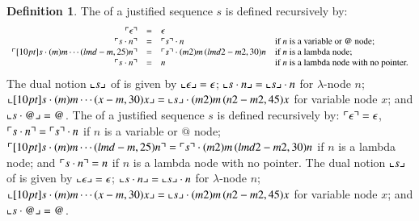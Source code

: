 \documentclass{elsarticle}
\newif\iflongversion
\theoremstyle{plain}
\theoremstyle{definition}
\newtheorem{definition}{Definition}[section]
\begin{document}
\begin{definition}
    \label{def:views}
\iflongversion %
The  of a justified sequence $s$ is defined recursively by:
$$\begin{array}{rcll}
 \pview{\epsilon} &=&  \epsilon \\
 \pview{s \cdot n }  &=&  \pview{s} \cdot n
    & \mbox{if $n$ is a variable or $@$ node;}
    \\
 \pview{\Pstr[10pt]{ s \cdot (m){m} \cdots (lmd-m,25){n}}} &=&
        \Pstr{ \pview{s} \cdot (m2){m} \, (lmd2-m2,30){n} }
    & \mbox{if $n$ is a lambda node;}
    \\
 \pview{s \cdot n }  &=&  n & \mbox{if $n$ is a lambda node with no pointer.}
\end{array}$$
%
The dual notion $\llcorner s \lrcorner$ of  is given by
$\llcorner \epsilon \lrcorner = \epsilon$;
$\llcorner s \cdot n  \lrcorner  =  \llcorner s \lrcorner \cdot n$ for $\lambda$-node $n$;
$\oview{\Pstr[10pt]{s \cdot (m){m} \cdots (x-m,30){x}}}= \Pstr{ \oview{s} \cdot (m2){m} \, (n2-m2,45){x} }$ for variable node $x$; and $\llcorner s \cdot @  \lrcorner = @$.
%
%
\else %
    The  of a justified sequence $s$ is defined recursively by:
    $\ulcorner \epsilon \urcorner = \epsilon$,
    $\ulcorner s \cdot n  \urcorner =  \ulcorner s \urcorner \cdot n$
        if $n$ is a variable or $@$ node;
    $\pview{\Pstr[10pt]{ s \cdot (m){m} \cdots (lmd-m,25){n}}} =
        \Pstr{ \pview{s} \cdot (m2){m} \, (lmd2-m2,30){n} }$
        if $n$ is a lambda node;
    and  $\ulcorner s \cdot n  \urcorner  =  n$
        if $n$ is a lambda node with no pointer.
    The dual notion $\llcorner s \lrcorner$ of  is given by
    $\llcorner \epsilon \lrcorner = \epsilon$;
    $\llcorner s \cdot n  \lrcorner  =  \llcorner s \lrcorner \cdot n$ for $\lambda$-node $n$;
    $\oview{\Pstr[10pt]{s \cdot (m){m} \cdots (x-m,30){x}}}= \Pstr{ \oview{s} \cdot (m2){m} \, (n2-m2,45){x} }$ for variable node $x$; and $\llcorner s \cdot @  \lrcorner = @$.

\end{definition}
\end{document}
